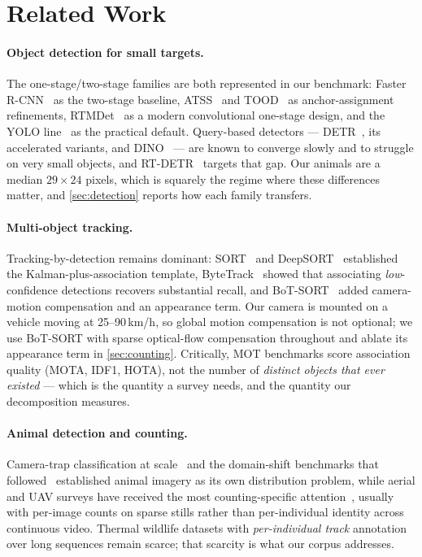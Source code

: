 \section{Related Work}
\label{sec:related}

\paragraph{Object detection for small targets.}
The one-stage/two-stage families are both represented in our benchmark: Faster
R-CNN~\cite{ren2015faster} as the two-stage baseline, ATSS~\cite{zhang2020atss} and
TOOD~\cite{feng2021tood} as anchor-assignment refinements, RTMDet~\cite{lyu2022rtmdet} as a
modern convolutional one-stage design, and the YOLO
line~\cite{redmon2016yolo,wang2024yolov9,wang2024yolov10} as the practical default.
Query-based detectors --- DETR~\cite{carion2020detr}, its accelerated variants, and
DINO~\cite{zhang2023dino} --- are known to converge slowly and to struggle on very small
objects, and RT-DETR~\cite{zhao2024rtdetr} targets that gap. Our animals are a median
$29\times24$ pixels, which is squarely the regime where these differences matter, and
\cref{sec:detection} reports how each family transfers.

\paragraph{Multi-object tracking.}
Tracking-by-detection remains dominant: SORT~\cite{bewley2016sort} and
DeepSORT~\cite{wojke2017deepsort} established the Kalman-plus-association template,
ByteTrack~\cite{zhang2022bytetrack} showed that associating \emph{low}-confidence detections
recovers substantial recall, and BoT-SORT~\cite{aharon2022botsort} added camera-motion
compensation and an appearance term. Our camera is mounted on a vehicle moving at
25--90\,km/h, so global motion compensation is not optional; we use BoT-SORT with sparse
optical-flow compensation throughout and ablate its appearance term in
\cref{sec:counting}. Critically, MOT benchmarks score association quality (MOTA, IDF1,
HOTA), not the number of \emph{distinct objects that ever existed} --- which is the quantity
a survey needs, and the quantity our decomposition measures.

\paragraph{Animal detection and counting.}
Camera-trap classification at scale~\cite{norouzzadeh2018automatically} and the domain-shift
benchmarks that followed~\cite{beery2018recognition} established animal imagery as its own
distribution problem, while aerial and UAV surveys have received the most counting-specific
attention~\cite{kellenberger2018detecting,corcoran2019automated}, usually with per-image
counts on sparse stills rather than per-individual identity across continuous video.
Thermal wildlife datasets with \emph{per-individual track} annotation over long sequences
remain scarce; that scarcity is what our corpus addresses.

